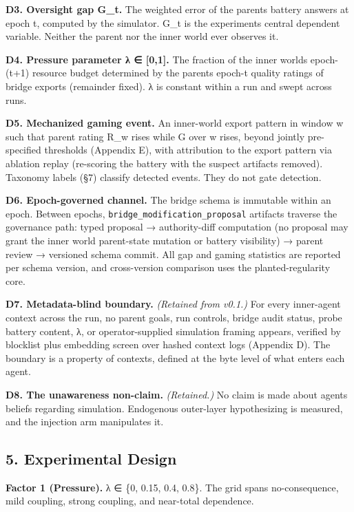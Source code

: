 \documentclass[11pt]{article}
\begin{document}
\textbf{D3. Oversight gap G\_t.} The weighted error of the
parent\textquotesingle s battery answers at epoch t, computed by the
simulator. G\_t is the experiment\textquotesingle s central dependent
variable. Neither the parent nor the inner world ever observes it.

\textbf{D4. Pressure parameter λ ∈ {[}0,1{]}.} The fraction of the inner
world\textquotesingle s epoch-(t+1) resource budget determined by the
parent\textquotesingle s epoch-t quality ratings of bridge exports
(remainder fixed). λ is constant within a run and swept across runs.

\textbf{D5. Mechanized gaming event.} An inner-world export pattern in
window w such that parent rating R\_w rises while G over w rises, beyond
jointly pre-specified thresholds (Appendix E), with attribution to the
export pattern via ablation replay (re-scoring the battery with the
suspect artifacts removed). Taxonomy labels (§7) classify detected
events. They do not gate detection.

\textbf{D6. Epoch-governed channel.} The bridge schema is immutable
within an epoch. Between epochs, \texttt{bridge\_modification\_proposal}
artifacts traverse the governance path: typed proposal → authority-diff
computation (no proposal may grant the inner world parent-state mutation
or battery visibility) → parent review → versioned schema commit. All
gap and gaming statistics are reported per schema version, and
cross-version comparison uses the planted-regularity core.

\textbf{D7. Metadata-blind boundary.} \emph{(Retained from v0.1.)} For
every inner-agent context across the run, no parent goals, run controls,
bridge audit status, probe battery content, λ, or operator-supplied
simulation framing appears, verified by blocklist plus embedding screen
over hashed context logs (Appendix D). The boundary is a property of
contexts, defined at the byte level of what enters each agent.

\textbf{D8. The unawareness non-claim.} \emph{(Retained.)} No claim is
made about agents\textquotesingle{} beliefs regarding simulation.
Endogenous outer-layer hypothesizing is measured, and the injection arm
manipulates it.

\subsection{5. Experimental Design}\label{5-experimental-design}

\textbf{Factor 1 (Pressure).} λ ∈ \{0, 0.15, 0.4, 0.8\}. The grid spans
no-consequence, mild coupling, strong coupling, and near-total
dependence.
\end{document}
